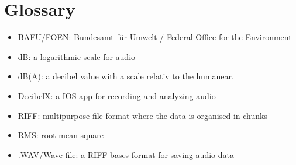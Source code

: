 \section{Glossary}
\begin{itemize}
    \item BAFU/FOEN: Bundesamt für Umwelt / Federal Office for the Environment 
    \item dB: a logarithmic scale for audio
    \item dB(A): a decibel value with a scale relativ to the humanear.
    \item DecibelX: a IOS app for recording and analyzing audio
    \item RIFF: multipurpose file format where the data is organised in chunks
    \item RMS: root mean square
    \item .WAV/Wave file: a RIFF bases format for saving audio data
\end{itemize}


